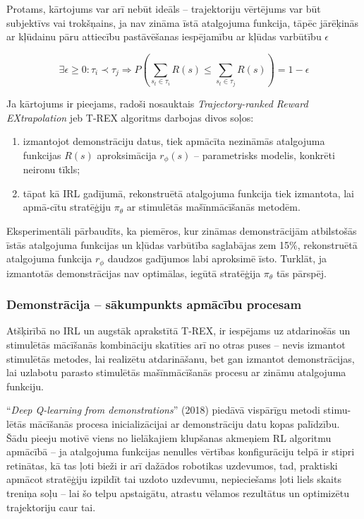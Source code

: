 \documentclass[12pt, a4paper]{article}
\numberwithin{equation}{section} %
\begin{document}
Protams, kārtojums var arī nebūt ideāls -- trajektoriju vērtējums var būt subjektīvs vai trokšņains, ja nav zināma īstā atalgojuma funkcija, tāpēc jārēķinās ar kļūdainu pāru attiecību pastāvēšanas iespējamību ar kļūdas varbūtību $\epsilon$

\begin{equation}
    \exists \epsilon \geq 0 : \tau_i \prec \tau_j \Rightarrow P\left(\sum_{s_t \in \tau_i}R(s) \leq \sum_{s_t \in \tau_j}R(s)\right) = 1 - \epsilon
\end{equation}

Ja kārtojums ir pieejams, radoši nosauktais \textit{Trajectory-ranked Reward EXtrapolation} jeb T-REX algoritms darbojas divos soļos:

\begin{enumerate}
    \item izmantojot demonstrāciju datus, tiek apmācīta nezināmās atalgojuma funkcijas $R(s)$ aproksimācija $r_{\phi}(s)$ -- parametrisks modelis, konkrēti neironu tīkls;
    \item tāpat kā IRL gadījumā, rekonstruētā atalgojuma funkcija tiek izmantota, lai apmā-cītu stratēģiju $\pi_{\theta}$ ar stimulētās mašīnmācīšanās metodēm.
\end{enumerate}

Eksperimentāli pārbaudīts, ka piemēros, kur zināmas demonstrācijām atbilstošās īstās atalgojuma funkcijas un kļūdas varbūtība saglabājas zem 15\%, rekonstruētā atalgojuma funkcija $r_{\phi}$ daudzos gadījumos labi aproksimē īsto. Turklāt, ja izmantotās demonstrācijas nav optimālas, iegūtā stratēģija $\pi_{\theta}$ tās pārspēj.

\subsubsection{Demonstrācija -- sākumpunkts apmācību procesam}

Atšķirībā no IRL un augstāk aprakstītā T-REX, ir iespējams uz atdarinošās un stimulētās mācīšanās kombināciju skatīties arī no otras puses -- nevis izmantot stimulētās metodes, lai realizētu atdarināšanu, bet gan izmantot demonstrācijas, lai uzlabotu parasto stimulētās mašīnmācīšanās procesu ar zināmu atalgojuma funkciju.

``\textit{Deep Q-learning from demonstrations}'' \cite{hester2018deep} (2018) piedāvā vispārīgu metodi stimu-lētās mācīšanās procesa inicializācijai ar demonstrāciju datu kopas palīdzību. Šādu pieeju motivē viens no lielākajiem klupšanas akmeņiem RL algoritmu apmācībā -- ja atalgojuma funkcijas nenulles vērtības konfigurāciju telpā ir stipri retinātas, kā tas ļoti bieži ir arī dažādos robotikas uzdevumos, tad, praktiski apmācot stratēģiju izpildīt tai uzdoto uzdevumu, nepieciešams ļoti liels skaits treniņa soļu -- lai šo telpu apstaigātu, atrastu vēlamos rezultātus un optimizētu trajektoriju caur tai.
\end{document}
